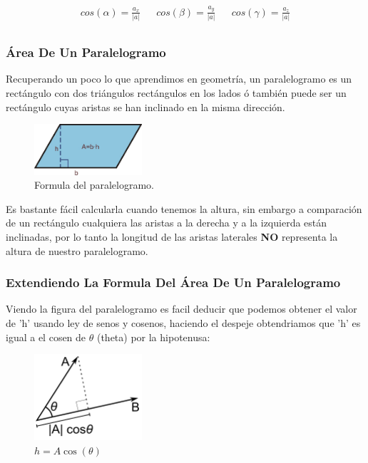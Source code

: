 \documentclass{article}
\begin{document}
\[\begin{aligned}
 cos(\alpha) = \frac{a_x}{|a|} && 
  cos(\beta) = \frac{a_y}{|a|} &&
 cos(\gamma) = \frac{a_z}{|a|} \\
\end{aligned}\] 



\subsubsection*{Área De Un Paralelogramo}
\label{sec:orgd4ed135}
Recuperando un poco lo que aprendimos en geometría, un paralelogramo es un rectángulo con dos triángulos rectángulos en los lados ó también puede ser un rectángulo cuyas aristas se han inclinado en la misma dirección. 

\begin{figure}[htbp]
\centering
\includegraphics[width=4cm]{img/area-paralelogramo.png}
\caption{Formula del paralelogramo.}
\end{figure}

Es bastante fácil calcularla cuando tenemos la altura, sin embargo a comparación de un rectángulo cualquiera las aristas a la derecha y a la izquierda están inclinadas, por lo tanto la longitud de las aristas laterales \textbf{NO} representa la altura de nuestro paralelogramo.

\subsubsection*{Extendiendo La Formula Del Área De Un Paralelogramo}
\label{sec:org4b03024}
Viendo la figura del paralelogramo es facil deducir que podemos obtener el valor de 'h' usando ley de senos y cosenos, haciendo el despeje obtendriamos que 'h' es igual a el cosen de \(\theta\) (theta) por la hipotenusa:

\begin{figure}[htbp]
\centering
\includegraphics[width=4cm]{img/despeje-paralelogramo.png}
\caption{\(h = A \cos(\theta)\)}
\end{figure}
\end{document}
